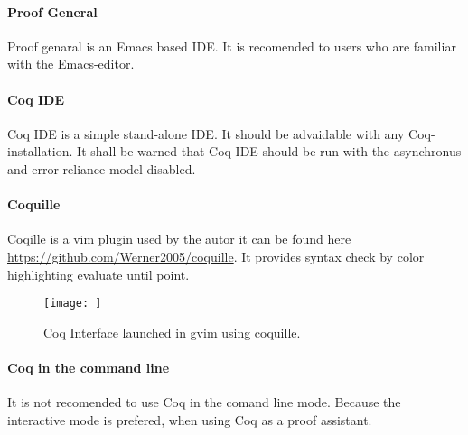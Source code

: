 \paragraph{Proof General}
Proof genaral is an Emacs based IDE. 
It is recomended to users who are familiar with the Emacs-editor.

\paragraph{Coq IDE}
Coq IDE is a simple stand-alone IDE. 
It should be advaidable with any Coq-installation. 
It shall be warned that Coq IDE should be run with the asynchronus and error reliance model disabled. 



\paragraph{Coquille}
Coqille is a vim plugin used by the autor it can be found here \url{https://github.com/Werner2005/coquille}.
It provides syntax check by color highlighting evaluate until point.

\begin{figure}[h]
\texttt{[image: ]}
\caption{Coq Interface launched in gvim using coquille.}
\end{figure}

\paragraph{Coq in the command line}
It is not recomended to use Coq in the comand line mode. 
Because the interactive mode is prefered, when using Coq as a proof assistant. 





